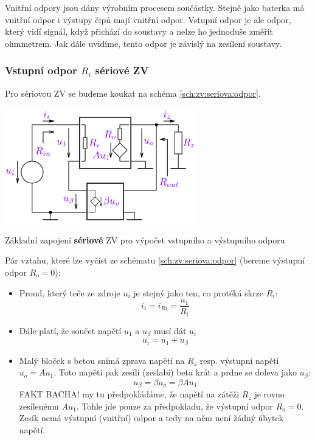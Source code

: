 \documentclass[a4paper,12pt]{article}   %
\begin{document}
Vnitřní odpory jsou dány výrobním procesem součástky. Stejně jako baterka má vnitřní odpor i výstupy čipů mají vnitřní odpor. Vstupní odpor je ale odpor, který vidí signál, když přichází do soustavy a nelze ho jednoduše změřit ohmmetrem. Jak dále uvidíme, tento odpor je závislý na zesílení soustavy.

\subsubsection*{Vstupní odpor $R_i$ sériové ZV}
Pro sériovou ZV se budeme koukat na schéma \ref{sch:zv:seriova:odpor}.
\begin{schema}[h!]
    \centering
    \includegraphics[height=5cm]{ZV_seriova-odpory.PNG}
    \caption{Základní zapojení \textbf{sériové} ZV pro výpočet vstupního a výstupního odporu}
    \label{sch:zv:seriova:odpor}
\end{schema}

Pár vztahu, které lze vyčíst ze schématu \ref{sch:zv:seriova:odpor} (bereme výstupní odpor $R_o = 0$):
\begin{itemize}
    \item Proud, který teče ze zdroje $u_i$ je stejný jako ten, co protéká skrze $R_i$:
    \begin{equation}
        i_i = i_{Ri} = \frac{u_\text{1}}{R_i}
        \label{eq:ri}
    \end{equation}
    \item Dále platí, že součet napětí $u_\text{1}$ a $u_\beta$ musí dát $u_i$
    \begin{equation}
        u_i = u_\text{1} + u_\beta
        \label{eq:soucet:napeti}
    \end{equation}
    \item Malý bloček s betou snímá zprava napětí na $R_z$ resp. výstupní napětí $u_o = Au_\text{1}$. Toto napětí pak zesílí (zeslabí) beta krát a prdne se doleva jako $u_\beta$:
    \begin{equation}
        u_\beta = \beta u_o = \beta A u_\text{1}
        \label{eq:beta:napeti}
    \end{equation}
    FAKT BACHA! my tu předpokládáme, že napětí na zátěži $R_z$ je rovno zesílenému $Au_\text{1}$. Tohle jde pouze za předpokladu, že výstupní odpor $R_o = 0$. Zesík nemá výstupní (vnitřní) odpor a tedy na něm není žádný úbytek napětí.
\end{itemize}
\end{document}
